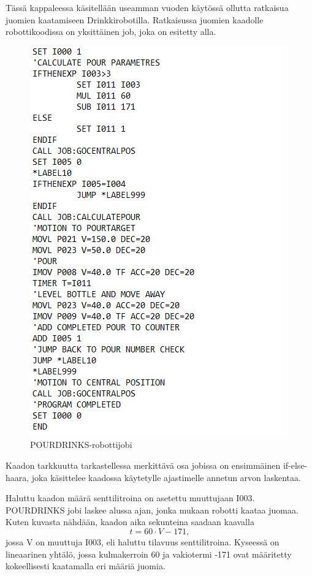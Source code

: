 Tässä kappaleessa käsitellään useamman vuoden käytössä ollutta ratkaisua juomien kaatamiseen Drinkkirobotilla. Ratkaisussa juomien kaadolle robottikoodissa on yksittäinen job, joka on esitetty alla.

\begin{figure}[h]
\begin{center}
\includegraphics[scale=0.8]{img/POURDRINKS.png}
\end{center}
\caption{POURDRINKS-robottijobi}
\label{fig:pourdrinks}
\end{figure}

Kaadon tarkkuutta tarkastellessa merkittävä osa jobissa on ensimmäinen if-else-haara, joka käsittelee kaadossa käytetylle ajastimelle annetun arvon laskentaa.

Haluttu kaadon määrä senttilitroina on asetettu muuttujaan I003. POURDRINKS jobi laskee alussa ajan, jonka mukaan robotti kaataa juomaa. Kuten kuvasta nähdään, kaadon aika sekunteina saadaan kaavalla
\[t = 60 \cdot V - 171, \]
jossa V on muuttuja I003, eli haluttu tilavuus senttilitroina. Kyseessä on lineaarinen yhtälö, jossa kulmakerroin 60 ja vakiotermi -171 ovat määritetty kokeellisesti kaatamalla eri määriä juomia.

